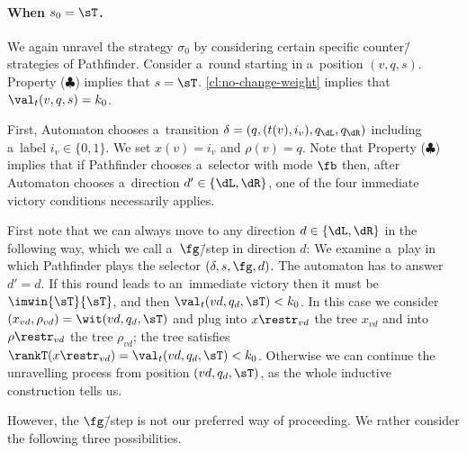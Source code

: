 \paragraph*{When $s_0=\sT$.}

We again unravel the strategy $\sigma_0$ by considering certain specific counter\=/strategies of Pathfinder.
Consider a~round starting in a~position $(v,q,s)$.
Property ($\clubsuit$) implies that $s=\sT$.
\cref{cl:no-change-weight} implies that $\val_t(v,q,s)=k_0$.

First, Automaton chooses a~transition $\delta=(q,(t(v),i_v),q_\dL,q_\dR)$ including a~label $i_v\in\{0,1\}$.
We set $x(v)=i_v$ and $\rho(v)=q$.
Note that Property ($\clubsuit$) implies that if Pathfinder chooses a~selector with mode $\fb$
then, after Automaton chooses a~direction $d'\in\{\dL,\dR\}$, one of the four immediate victory conditions necessarily applies.

First note that we can always move to any direction $d\in\{\dL,\dR\}$ in the following way, which we call a~$\fg$\=/step in direction $d$:
We examine a~play in which Pathfinder plays the selector $(\delta,s,\fg,d)$.
The automaton has to answer $d'=d$.
If this round leads to an~immediate victory then it must be $\imwin{\sT}{\sT}$, and then $\val_t(vd,q_d,\sT)<k_0$.
In this case we consider $(x_{vd},\rho_{vd})=\wit(vd,q_d,\sT)$ and plug into $x\restr_{vd}$ the tree $x_{vd}$ and into $\rho\restr_{vd}$ the tree $\rho_{vd}$;
the tree satisfies $\rankT(x\restr_{vd})=\val_t(vd,q_{d},\sT)<k_0$.
Otherwise we can continue the unravelling process from position $(vd,q_d,\sT)$, as the whole inductive construction tells us.

However, the $\fg$\=/step is not our preferred way of proceeding.
We rather consider the following three possibilities.

